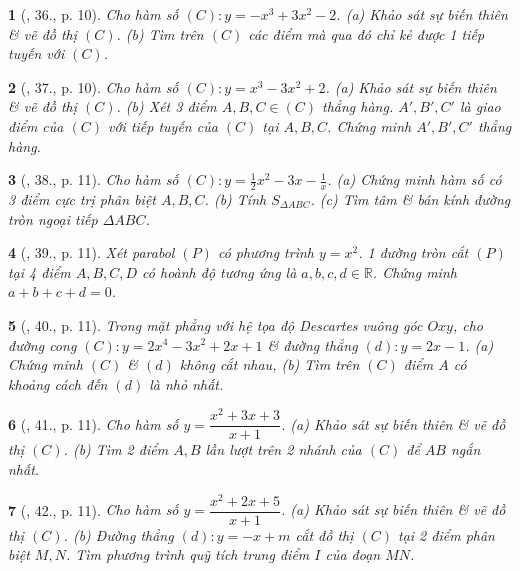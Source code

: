 \documentclass{article}
\newtheorem{baitoan}{}
\begin{document}
\begin{baitoan}[\cite{TLCT_BT_giai_tich_12}, 36., p. 10]
	Cho hàm số $(C):y = -x^3 + 3x^2 - 2$. (a) Khảo sát sự biến thiên \& vẽ đồ thị $(C)$. (b) Tìm trên $(C)$ các điểm mà qua đó chỉ kẻ được 1 tiếp tuyến với $(C)$.
\end{baitoan}

\begin{baitoan}[\cite{TLCT_BT_giai_tich_12}, 37., p. 10]
	Cho hàm số $(C):y = x^3 - 3x^2 + 2$. (a) Khảo sát sự biến thiên \& vẽ đồ thị $(C)$. (b) Xét 3 điểm $A,B,C\in(C)$ thẳng hàng. $A',B',C'$ là giao điểm của $(C)$ với tiếp tuyến của $(C)$ tại $A,B,C$. Chứng minh $A',B',C'$ thẳng hàng.
\end{baitoan}

\begin{baitoan}[\cite{TLCT_BT_giai_tich_12}, 38., p. 11]
	Cho hàm số $(C):y = \frac{1}{2}x^2 - 3x - \frac{1}{x}$. (a) Chứng minh hàm số có 3 điểm cực trị phân biệt $A,B,C$. (b) Tính $S_{\Delta ABC}$. (c) Tìm tâm \& bán kính đường tròn ngoại tiếp $\Delta ABC$. 
\end{baitoan}

\begin{baitoan}[\cite{TLCT_BT_giai_tich_12}, 39., p. 11]
	Xét parabol $(P)$ có phương trình $y = x^2$. 1 đường tròn cắt $(P)$ tại 4 điểm $A,B,C,D$ có hoành độ tương ứng là $a,b,c,d\in\mathbb{R}$. Chứng minh $a + b + c + d = 0$.
\end{baitoan}

\begin{baitoan}[\cite{TLCT_BT_giai_tich_12}, 40., p. 11]
	Trong mặt phẳng với hệ tọa độ Descartes vuông góc $Oxy$, cho đường cong $(C):y = 2x^4 - 3x^2 + 2x + 1$ \& đường thẳng $(d):y = 2x - 1$. (a) Chứng minh $(C)$ \& $(d)$ không cắt nhau, (b) Tìm trên $(C)$ điểm $A$ có khoảng cách đến $(d)$ là nhỏ nhất.
\end{baitoan}

\begin{baitoan}[\cite{TLCT_BT_giai_tich_12}, 41., p. 11]
	Cho hàm số $y = \dfrac{x^2 + 3x + 3}{x + 1}$. (a) Khảo sát sự biến thiên \& vẽ đồ thị $(C)$. (b) Tìm 2 điểm $A,B$ lần lượt trên 2 nhánh của $(C)$ để $AB$ ngắn nhất.
\end{baitoan}

\begin{baitoan}[\cite{TLCT_BT_giai_tich_12}, 42., p. 11]
	Cho hàm số $y = \dfrac{x^2 + 2x + 5}{x + 1}$. (a) Khảo sát sự biến thiên \& vẽ đồ thị $(C)$. (b) Đường thẳng $(d):y = -x + m$ cắt đồ thị $(C)$ tại 2 điểm phân biệt $M,N$. Tìm phương trình quỹ tích trung điểm $I$ của đoạn $MN$.
\end{baitoan}
\end{document}
